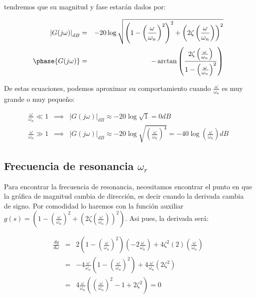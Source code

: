         tendremos que su magnitud y fase estarán dados por:

        \begin{eqnarray*}
            \left| G(j \omega) \right|_{dB} & = & -20 \log{\sqrt{\left( 1 - \left( \frac{\omega}{\omega_n} \right)^2 \right)^2 + \left( 2 \zeta \left( \frac{\omega}{\omega_n} \right) \right)^2}} \\
            \phase{G(j \omega)} & = & -\arctan{\left( \frac{2 \zeta \left( \frac{\omega}{\omega_n} \right)}{1 - \left( \frac{\omega}{\omega_n} \right)^2} \right)}
        \end{eqnarray*}

        De estas ecuaciones, podemos aproximar su comportamiento cuando $\frac{\omega}{\omega_n}$ es muy grande o muy pequeño:

        \begin{eqnarray*}
            \frac{\omega}{\omega_n} \ll 1 & \implies & \left| G(j \omega) \right|_{dB} \approx -20 \log{\sqrt{1}} = 0 dB \\
            \frac{\omega}{\omega_n} \gg 1 & \implies & \left| G(j \omega) \right|_{dB} \approx -20 \log{\sqrt{\left( \frac{\omega}{\omega_n} \right)^4}} = -40 \log{\left( \frac{\omega}{\omega_n} \right)} dB
        \end{eqnarray*}


        \subsection{Frecuencia de resonancia $\omega_r$}

            Para encontrar la frecuencia de resonancia, necesitamos encontrar el punto en que la gráfica de magnitud cambia de dirección, es decir cuando la derivada cambia de signo. Por comodidad lo haremos con la función auxiliar $g(s) = \left( 1 - \left( \frac{\omega}{\omega_n} \right)^2 + \left( 2 \zeta \left( \frac{\omega}{\omega_n} \right) \right)^2 \right)$. Asi pues, la derivada será:

            \begin{eqnarray*}
                \frac{d g}{d \omega} & = & 2 \left( 1 - \left( \frac{\omega}{\omega_n} \right)^2 \right) \left( -2 \frac{\omega}{\omega_n} \right) + 4 \zeta^2 (2) \left( \frac{\omega}{\omega_n} \right) \\
                & = & -4 \frac{\omega}{\omega_n} \left( 1 - \left( \frac{\omega}{\omega_n} \right)^2 \right) + 4 \frac{\omega}{\omega_n} \left( 2 \zeta^2 \right) \\
                & = & 4 \frac{\omega}{\omega_n} \left( \left( \frac{\omega}{\omega_n} \right)^2 - 1 + 2 \zeta^2 \right) = 0
            \end{eqnarray*}

